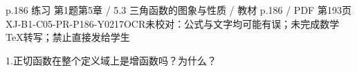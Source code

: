\begin{bankitem}{p.186 练习 第1题}{第5章 / 5.3 三角函数的图象与性质 / 教材 p.186 / PDF 第193页}{XJ-B1-C05-PR-P186-Y0217}{OCR未校对：公式与文字均可能有误；未完成数学TeX转写；禁止直接发给学生}
\begin{ocrdraft}
\par
1.正切函数在整个定义域上是增函数吗？为什么？
\end{ocrdraft}
\end{bankitem}
